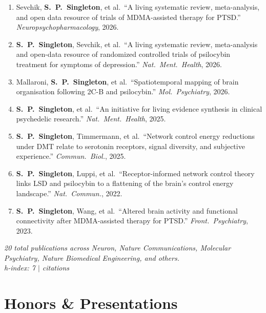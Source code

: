 \documentclass[10pt, letterpaper]{article}
\newcommand{\me}{\textbf{S.\ P.\ Singleton}}
\begin{document}
{\small
\begin{enumerate}[leftmargin=1.5em, itemsep=1pt, parsep=0pt, topsep=1pt]
  \item Sevchik, \me, et al.\ ``A living systematic review, meta-analysis, and open data resource of trials of MDMA-assisted therapy for PTSD.'' \textit{Neuropsychopharmacology}, 2026.

  \item \me, Sevchik, et al.\ ``A living systematic review, meta-analysis and open-data resource of randomized controlled trials of psilocybin treatment for symptoms of depression.'' \textit{Nat.\ Ment.\ Health}, 2026.

  \item Mallaroni, \me, et al.\ ``Spatiotemporal mapping of brain organisation following 2C-B and psilocybin.'' \textit{Mol.\ Psychiatry}, 2026.

  \item \me, et al.\ ``An initiative for living evidence synthesis in clinical psychedelic research.'' \textit{Nat.\ Ment.\ Health}, 2025.

  \item \me, Timmermann, et al.\ ``Network control energy reductions under DMT relate to serotonin receptors, signal diversity, and subjective experience.'' \textit{Commun.\ Biol.}, 2025.

  \item \me, Luppi, et al.\ ``Receptor-informed network control theory links LSD and psilocybin to a flattening of the brain's control energy landscape.'' \textit{Nat.\ Commun.}, 2022.

  \item \me, Wang, et al.\ ``Altered brain activity and functional connectivity after MDMA-assisted therapy for PTSD.'' \textit{Front.\ Psychiatry}, 2023.
\end{enumerate}
\vspace{-0.1em}
\textcolor{light}{\textit{20 total publications across Neuron, Nature Communications, Molecular Psychiatry, Nature Biomedical Engineering, and others.}} \\
\textcolor{light}{\textit{h-index: 7 \enspace$\vert$ citations}}
}

\section{Honors \& Presentations}
\end{document}
